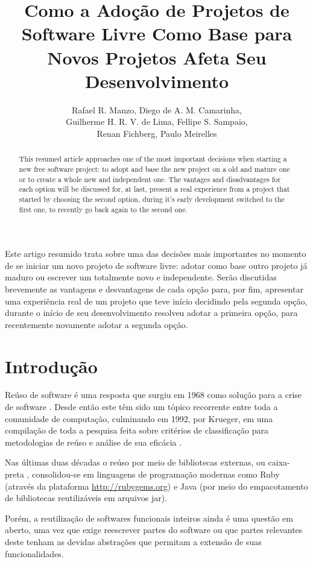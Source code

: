 \documentclass[12pt]{article}
\title{Como a Adoção de Projetos de Software Livre Como Base para Novos Projetos Afeta Seu Desenvolvimento}
\author{Rafael R. Manzo\inst{1}, Diego de A. M. Camarinha\inst{1},\\
        Guilherme H. R. V. de Lima\inst{1}, Fellipe S. Sampaio\inst{1},\\
        Renan Fichberg\inst{1}, Paulo Meirelles\inst{2}}
\begin{document}
 

\maketitle

\begin{abstract}
  This resumed article approaches one of the most important decisions when starting a new free software project: to adopt and base the new project on a old and mature one or to create a whole new and independent one. The vantages and disadvantages for each option will be discussed for, at last, present a real experience from a project that started by choosing the second option, during it's early development switched to the first one, to recently go back again to the second one.
\end{abstract}
     
\begin{resumo} 
  Este artigo resumido trata sobre uma das decisões mais importantes no momento de se iniciar um novo projeto de software livre: adotar como base outro projeto já maduro ou escrever um totalmente novo e independente. Serão discutidas brevemente as vantagens e desvantagens de cada opção para, por fim, apresentar uma experiência real de um projeto que teve início decidindo pela segunda opção, durante o início de seu desenvolvimento resolveu adotar a primeira opção, para recentemente novamente adotar a segunda opção.
\end{resumo}


\section{Introdução} \label{sec:introducao}
Reúso de software é uma resposta que surgiu em 1968 como solução para a crise de software \cite{nr68}. Desde então este têm sido um tópico recorrente entre toda a comunidade de computação, culminando em 1992, por Krueger, em uma compilação de toda a pesquisa feita sobre critérios de classificação para metodologias de reúso e análise de sua eficácia \cite{k92}.

Nas últimas duas décadas o reúso por meio de bibliotecas externas, ou caixa-preta \cite{hdghi11}, consolidou-se em linguagens de programação modernas como Ruby (através da plataforma \url{http://rubygems.org}) e Java (por meio do empacotamento de bibliotecas reutilizáveis em arquivos jar).

Porém, a reutilização de softwares funcionais inteiros ainda é uma questão em aberto, uma vez que exige reescrever partes do software ou que partes relevantes deste tenham as devidas abstrações que permitam a extensão de suas funcionalidades.
\end{document}
